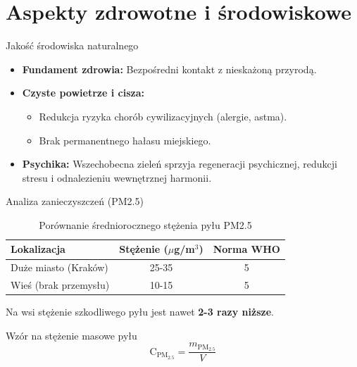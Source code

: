 \section{Aspekty zdrowotne i środowiskowe}

\begin{frame}{Jakość środowiska naturalnego}
    \begin{itemize}
        \item \textbf{Fundament zdrowia:} Bezpośredni kontakt z nieskażoną przyrodą.
        \item \textbf{Czyste powietrze i cisza:} 
        \begin{itemize}
            \item Redukcja ryzyka chorób cywilizacyjnych (alergie, astma).
            \item Brak permanentnego hałasu miejskiego.
        \end{itemize}
        \item \textbf{Psychika:} Wszechobecna zieleń sprzyja regeneracji psychicznej, redukcji stresu i odnalezieniu wewnętrznej harmonii.
    \end{itemize}
\end{frame}

\begin{frame}{Analiza zanieczyszczeń (PM2.5)}
    \begin{table}
        \centering
        \small
        \caption{Porównanie średniorocznego stężenia pyłu PM2.5 \cite{link1}}
        \begin{tabular}{|l|c|c|}
            \hline
            \textbf{Lokalizacja} & \textbf{Stężenie ($\mu$g/m$^3$)} & \textbf{Norma WHO} \\ \hline
            Duże miasto (Kraków) & 25-35 & 5 \\ \hline
            Wieś (brak przemysłu) & 10-15 & 5 \\ \hline
        \end{tabular}
    \end{table}

    \vspace{0.5cm}
    
    Na wsi stężenie szkodliwego pyłu jest nawet \textbf{2-3 razy niższe}.
    
    \begin{block}{Wzór na stężenie masowe pyłu}
        $$ \text{C}_{\text{PM}_{2.5}} = \frac{m_{\text{PM}_{2.5}}}{V} $$
    \end{block}
\end{frame}

